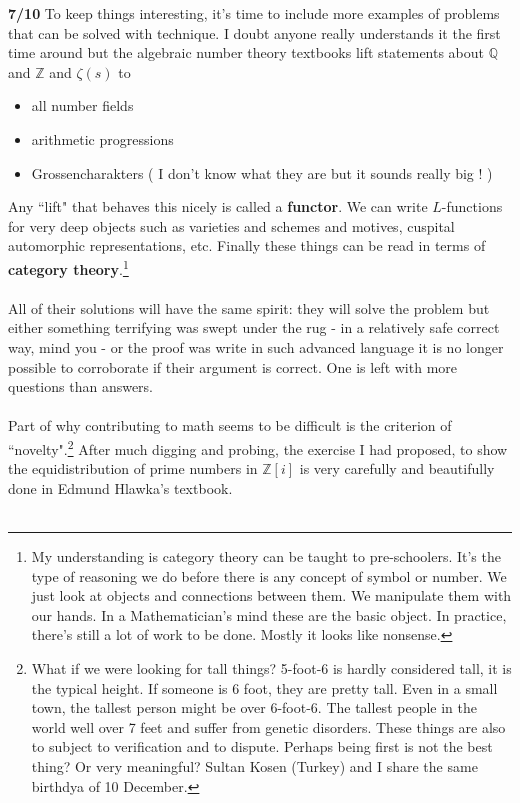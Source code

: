 \documentclass[12pt]{article}
\begin{document}
\newpage

\noindent \textbf{7/10}  To keep things interesting, it's time to include more examples of problems that can be solved with technique.  I doubt anyone really understands it the first time around but the algebraic number theory textbooks lift statements about $\mathbb{Q}$ and $\mathbb{Z}$ and $\zeta(s)$ to 
\begin{itemize}
\item all number fields
\item arithmetic progressions
\item Grossencharakters ( I don't know what they are but it sounds really big ! )
\end{itemize}
Any ``lift" that behaves this nicely is called a \textbf{functor}.  We can write $L$-functions for very deep objects such as varieties and schemes and motives, cuspital automorphic representations, etc.  Finally these things can be read in terms of \textbf{category theory}.\footnote{My understanding is category theory can be taught to pre-schoolers.  It's the type of reasoning we do before there is any concept of symbol or number.  We just look at objects and connections between them.  We manipulate them with our hands.  In a Mathematician's mind these are the basic object.  In practice, there's still a lot of work to be done.  Mostly it looks like nonsense.} \\ \\
All of their solutions will have the same spirit: they will solve the problem but either something terrifying was swept under the rug - in a relatively safe correct way, mind you - or the proof was write in such advanced language it is no longer possible to corroborate if their argument is correct. One is left with more questions than answers. \\ \\
Part of why contributing to math seems to be difficult is the criterion of ``novelty".\footnote{What if we were looking for tall things?  5-foot-6 is hardly considered tall, it is the typical height.  If someone is 6 foot, they are pretty tall.  Even in a small town, the tallest person might be over 6-foot-6.  The tallest people in the world well over 7 feet and suffer from genetic disorders.  These things are also to subject to verification and to dispute.  Perhaps being first is not the best thing? Or very meaningful? Sultan Kosen (Turkey) and I share the same birthdya of 10 December.} After much digging and probing, the exercise I had proposed, to show the equidistribution of prime numbers in $\mathbb{Z}[i]$ is very carefully and beautifully done in Edmund Hlawka's textbook. \\ \\
\end{document}
